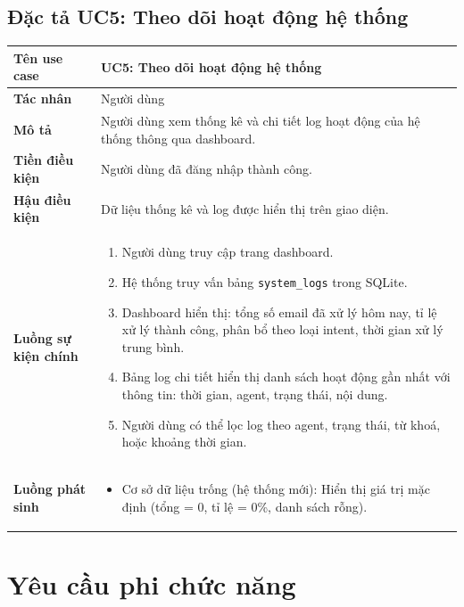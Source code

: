 \documentclass[../DoAn.tex]{subfiles}
\begin{document}
\subsection{Đặc tả UC5: Theo dõi hoạt động hệ thống}

\begin{table}[H]
\centering
\small
\begin{tabular}{|p{3.5cm}|p{10cm}|}
\hline
\textbf{Tên use case} & UC5: Theo dõi hoạt động hệ thống \\
\hline
\textbf{Tác nhân} & Người dùng \\
\hline
\textbf{Mô tả} & Người dùng xem thống kê và chi tiết log hoạt động của hệ thống thông qua dashboard. \\
\hline
\textbf{Tiền điều kiện} & Người dùng đã đăng nhập thành công. \\
\hline
\textbf{Hậu điều kiện} & Dữ liệu thống kê và log được hiển thị trên giao diện. \\
\hline
\textbf{Luồng sự kiện chính} &
\begin{enumerate}
    \item Người dùng truy cập trang dashboard.
    \item Hệ thống truy vấn bảng \texttt{system\_logs} trong SQLite.
    \item Dashboard hiển thị: tổng số email đã xử lý hôm nay, tỉ lệ xử lý thành công, phân bổ theo loại intent, thời gian xử lý trung bình.
    \item Bảng log chi tiết hiển thị danh sách hoạt động gần nhất với thông tin: thời gian, agent, trạng thái, nội dung.
    \item Người dùng có thể lọc log theo agent, trạng thái, từ khoá, hoặc khoảng thời gian.
\end{enumerate} \\
\hline
\textbf{Luồng phát sinh} &
\begin{itemize}
    \item[2a.] Cơ sở dữ liệu trống (hệ thống mới): Hiển thị giá trị mặc định (tổng = 0, tỉ lệ = 0\%, danh sách rỗng).
\end{itemize} \\
\hline
\end{tabular}
\end{table}

\section{Yêu cầu phi chức năng}
\label{section:2.4}
\end{document}
